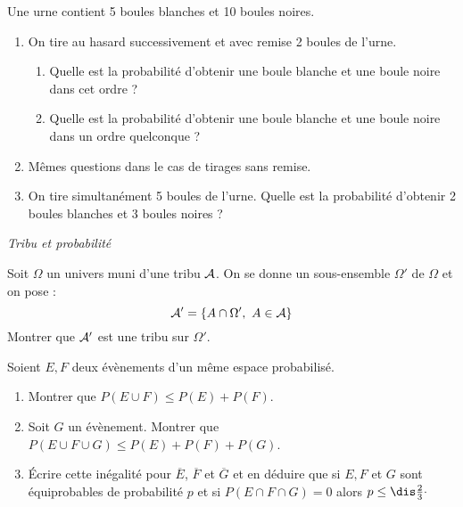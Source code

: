 \documentclass[a4paper,10pt]{report}
\begin{document}
\begin{Exercice}{} Une urne contient 5 boules blanches et 10 boules noires.

\begin{enumerate}
\item On tire au hasard successivement et avec remise 2 boules de l'urne.
\begin{enumerate}
\item Quelle est la probabilité d'obtenir une boule blanche et une boule noire dans cet ordre ?
\item Quelle est la probabilité d'obtenir une boule blanche et une boule noire dans un ordre quelconque ?
\end{enumerate}
\item Mêmes questions dans le cas de tirages sans remise.
\item On tire simultanément 5 boules de l'urne. Quelle est la probabilité d'obtenir 2 boules blanches et 3 boules noires ?
\end{enumerate}
\end{Exercice}





\medskip

\begin{center}
\textit{{ {\large Tribu et probabilité}}}
\end{center}

\medskip


\begin{Exercice}{}  Soit $\Omega$ un univers muni d'une tribu ${\cal A}$. On se donne un sous-ensemble $\Omega'$ de $\Omega$ et on pose :
 $${\cal A}'=\{A\cap \Omega',\ A\in{\cal A}\}$$
Montrer que ${\cal A}'$ est une tribu sur $\Omega'.$
\end{Exercice}


\begin{Exercice}{}  Soient $E,F$ deux évènements d'un même espace probabilisé.
\begin{enumerate}
\item Montrer que $P(E \cup F) \leq P(E) + P(F)$.
\item Soit $G$ un évènement. Montrer que $P(E \cup F \cup G) \leq P(E) + P(F) + P(G)$.
\item Écrire cette inégalité pour $\overline{E}$, $\overline{F}$ et $\overline{G}$ et en déduire que si $E,F$ et $G$ sont équiprobables de probabilité $p$ et si $P(E \cap F \cap G)=0$ alors $p \leq \dis \frac{2}{3} \cdot$
\end{enumerate}
\end{Exercice}
\end{document}
